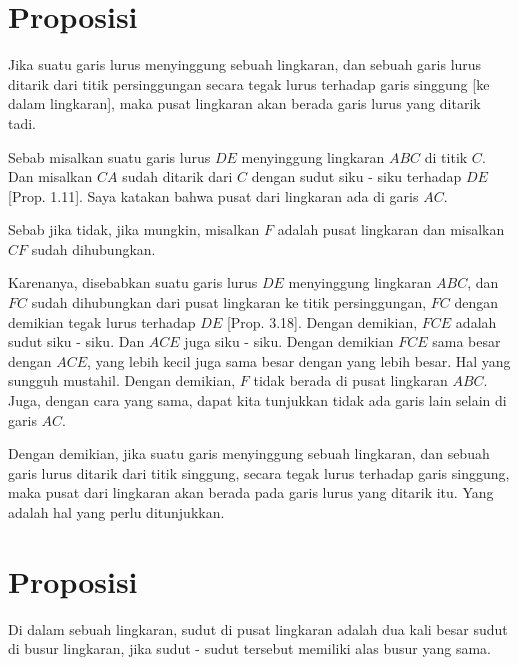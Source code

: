\documentclass[a4paper]{book}
\begin{document}
\section*{\centering Proposisi \thesection}
Jika suatu garis lurus menyinggung sebuah lingkaran, dan sebuah garis lurus 
ditarik dari titik persinggungan secara tegak lurus terhadap garis singgung [ke
dalam lingkaran], maka pusat lingkaran akan berada garis lurus yang ditarik 
tadi.
\begin{center}
\end{center}
Sebab misalkan suatu garis lurus $DE$ menyinggung lingkaran $ABC$ di titik $C$.
Dan misalkan $CA$ sudah ditarik dari $C$ dengan sudut siku - siku terhadap $DE$
[Prop. 1.11]. Saya katakan bahwa pusat dari lingkaran ada di garis $AC$.

Sebab jika tidak, jika mungkin, misalkan $F$ adalah pusat lingkaran dan 
misalkan $CF$ sudah dihubungkan.

Karenanya, disebabkan suatu garis lurus $DE$ menyinggung lingkaran $ABC$, 
dan $FC$
sudah dihubungkan dari pusat lingkaran ke titik persinggungan, $FC$ dengan 
demikian tegak lurus terhadap $DE$ [Prop. 3.18]. Dengan demikian, $FCE$ adalah 
sudut siku - siku. Dan $ACE$ juga siku - siku. Dengan demikian $FCE$ sama besar
dengan $ACE$, yang lebih kecil juga sama besar dengan yang lebih besar. Hal 
yang sungguh mustahil. Dengan demikian, $F$ tidak berada di pusat lingkaran 
$ABC$. Juga, dengan cara yang sama, dapat kita tunjukkan tidak ada garis lain
selain di garis $AC$.

Dengan demikian, jika suatu garis menyinggung sebuah lingkaran, dan sebuah 
garis lurus ditarik dari titik singgung, secara tegak lurus terhadap garis
singgung, maka pusat dari lingkaran akan berada pada garis lurus yang ditarik 
itu. Yang adalah hal yang perlu ditunjukkan.

\section*{\centering Proposisi \thesection}
Di dalam sebuah lingkaran, sudut di pusat lingkaran adalah dua kali besar sudut
di busur lingkaran, jika sudut - sudut tersebut memiliki alas busur yang sama.
\end{document}
